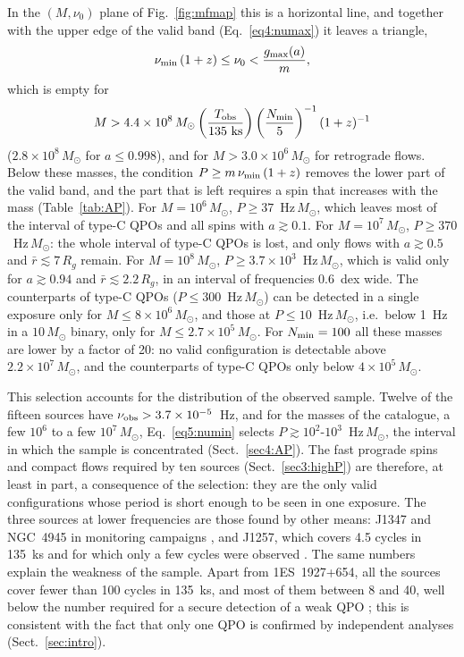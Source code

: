 In the $(M,\nu_0)$ plane of Fig.~\ref{fig:mfmap} this is a horizontal line, and together with the upper edge of the valid band (Eq.~\ref{eq4:numax}) it leaves a triangle,
\begin{equation}
    \label{eq5:triangle}
    \nu_\textup{min}\,(1+z)\leq\nu_0<\frac{g_\textup{max}(a)}{m},
\end{equation}
which is empty for
\begin{equation}
    \label{eq5:Mdet}
    M>4.4\times10^{8}\,M_\odot\left(\frac{T_\textup{obs}}{135~\textup{ks}}\right)\left(\frac{N_\textup{min}}{5}\right)^{-1}(1+z)^{-1}
\end{equation}
($2.8\times10^8\,M_\odot$ for $a\leq0.998$), and for $M>3.0\times10^6\,M_\odot$ for retrograde flows.
Below these masses, the condition $P\geq m\,\nu_\textup{min}\,(1+z)$ removes the lower part of the valid band, and the part that is left requires a spin that increases with the mass (Table~\ref{tab:AP}).
For $M=10^6\,M_\odot$, $P\geq37$~Hz\,$M_\odot$, which leaves most of the interval of type-C QPOs and all spins with $a\gtrsim0.1$.
For $M=10^7\,M_\odot$, $P\geq370$~Hz\,$M_\odot$: the whole interval of type-C QPOs is lost, and only flows with $a\gtrsim0.5$ and $\bar r\lesssim7\,R_g$ remain.
For $M=10^8\,M_\odot$, $P\geq3.7\times10^3$~Hz\,$M_\odot$, which is valid only for $a\gtrsim0.94$ and $\bar r\lesssim2.2\,R_g$, in an interval of frequencies 0.6~dex wide.
The counterparts of type-C QPOs ($P\leq300$~Hz\,$M_\odot$) can be detected in a single exposure only for $M\leq8\times10^6\,M_\odot$, and those at $P\leq10$~Hz\,$M_\odot$, i.e.\ below 1~Hz in a $10\,M_\odot$ binary, only for $M\leq2.7\times10^5\,M_\odot$.
For $N_\textup{min}=100$ all these masses are lower by a factor of 20: no valid configuration is detectable above $2.2\times10^7\,M_\odot$, and the counterparts of type-C QPOs only below $4\times10^5\,M_\odot$.

This selection accounts for the distribution of the observed sample.
Twelve of the fifteen sources have $\nu_\textup{obs}>3.7\times10^{-5}$~Hz, and for the masses of the catalogue, a few $10^6$ to a few $10^7\,M_\odot$, Eq.~\eqref{eq5:numin} selects $P\gtrsim10^2$-$10^3$~Hz\,$M_\odot$, the interval in which the sample is concentrated (Sect.~\ref{sec4:AP}).
The fast prograde spins and compact flows required by ten sources (Sect.~\ref{sec3:highP}) are therefore, at least in part, a consequence of the selection: they are the only valid configurations whose period is short enough to be seen in one exposure.
The three sources at lower frequencies are those found by other means: J1347 and NGC~4945 in monitoring campaigns \citep{Carpano2018,Smith2020}, and J1257, which covers 4.5 cycles in 135~ks and for which only a few cycles were observed \citep{j1257}.
The same numbers explain the weakness of the sample.
Apart from 1ES~1927+654, all the sources cover fewer than 100 cycles in 135~ks, and most of them between 8 and 40, well below the number required for a secure detection of a weak QPO \citep{VaughanUttley2005}; this is consistent with the fact that only one QPO is confirmed by independent analyses (Sect.~\ref{sec:intro}).

